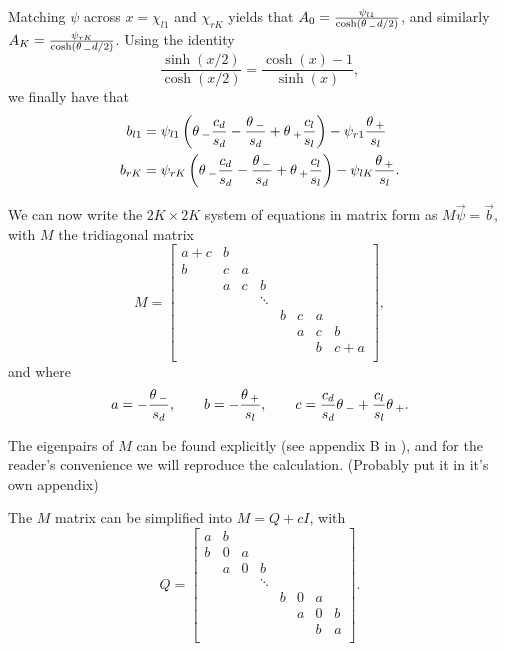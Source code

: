 Matching $\psi$ across $x=\chi_{l1}$ and $\chi_{rK}$ yields that $A_0 = \frac{\psi_{l1}}{\cosh(\theta\,_-d/2)}$, and similarly $A_K = \frac{\psi_{rK}}{\cosh(\theta\,_-d/2)}$. Using the identity
% 
\[
\frac{\sinh(x/2)}{\cosh(x/2)} = \frac{\cosh(x)-1}{\sinh(x)},
\]
% 
we finally have that 
% 
\begin{equation*}
\begin{split}
\begin{aligned}
  b_{l1} &= \psi_{l1}\left(\theta\,_-\frac{c_d}{s_d} - \frac{\theta\,_-}{s_d} + \theta\,_+\frac{c_l}{s_l} \right) - \psi_{r1}\frac{\theta\,_+}{s_l}\\
  b_{rK} &= \psi_{rK}\left(\theta\,_-\frac{c_d}{s_d} - \frac{\theta\,_-}{s_d} + \theta\,_+\frac{c_l}{s_l} \right) - \psi_{lK}\frac{\theta\,_+}{s_l}.
\end{aligned}
\end{split}
\end{equation*}

We can now write the $2K\times2K$ system of equations in matrix form as $M\vec{\psi} = \vec{b}$, with $M$ the tridiagonal matrix
% 
\[
  M 
  = \left[
	\begin{matrix}
	  a+c & b \\
	  b & c & a \\
	  & a &c & b \\
	  & & & \ddots \\
	  & & & & b & c & a\\
	  & & & & & a & c & b\\
	  & & & & & & b & c + a\\
	\end{matrix}\right],
\]
% 
and where
% 
\[
  a = -\frac{\theta\,_-}{s_d},\qquad b = - \frac{\theta\,_+}{s_l},\qquad c = \frac{c_d}{s_d}\theta\,_-+\frac{c_l}{s_l}\theta\,_+.
\]

The eigenpairs of $M$ can be found explicitly (see appendix B in \cite{ren_spectra_2003}), and for the reader's convenience we will reproduce the calculation. (Probably put it in it's own appendix)

The $M$ matrix can be simplified into $M = Q + cI$, with 
% 
\[
  Q 
  = \left[
	\begin{matrix}
	  a & b \\
	  b & 0 & a \\
	  & a &0 & b \\
	  & & & \ddots \\
	  & & & & b & 0 & a\\
	  & & & & & a & 0 & b\\
	  & & & & & & b & a\\
	\end{matrix}\right].
\]
% 

